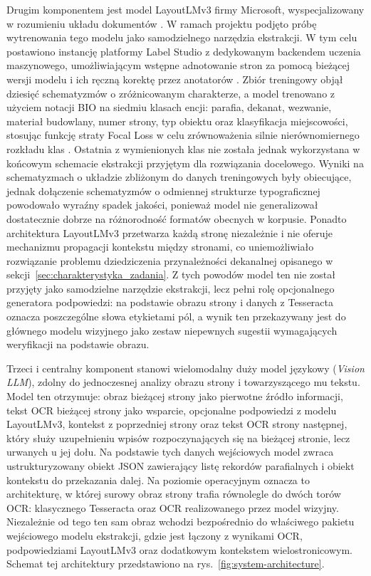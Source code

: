 Drugim komponentem jest model LayoutLMv3 firmy Microsoft, wyspecjalizowany w rozumieniu układu dokumentów \parencite{huang2022layoutlmv3}.
W ramach projektu podjęto próbę wytrenowania tego modelu jako samodzielnego narzędzia ekstrakcji.
W tym celu postawiono instancję platformy Label Studio z dedykowanym backendem uczenia maszynowego, umożliwiającym wstępne adnotowanie stron za pomocą bieżącej wersji modelu i ich ręczną korektę przez anotatorów \parencite{labelstudio_ml_backend_2026}.
Zbiór treningowy objął dziesięć schematyzmów o zróżnicowanym charakterze, a model trenowano z użyciem notacji BIO na siedmiu klasach encji: parafia, dekanat, wezwanie, materiał budowlany, numer strony, typ obiektu oraz klasyfikacja miejscowości, stosując funkcję straty Focal Loss w celu zrównoważenia silnie nierównomiernego rozkładu klas \parencite{lin2017focal}.
Ostatnia z wymienionych klas nie została jednak wykorzystana w końcowym schemacie ekstrakcji przyjętym dla rozwiązania docelowego.
Wyniki na schematyzmach o układzie zbliżonym do danych treningowych były obiecujące, jednak dołączenie schematyzmów o odmiennej strukturze typograficznej powodowało wyraźny spadek jakości, ponieważ model nie generalizował dostatecznie dobrze na różnorodność formatów obecnych w korpusie.
Ponadto architektura LayoutLMv3 przetwarza każdą stronę niezależnie i nie oferuje mechanizmu propagacji kontekstu między stronami, co uniemożliwiało rozwiązanie problemu dziedziczenia przynależności dekanalnej opisanego w sekcji~\ref{sec:charakterystyka_zadania}.
Z tych powodów model ten nie został przyjęty jako samodzielne narzędzie ekstrakcji, lecz pełni rolę opcjonalnego generatora podpowiedzi: na podstawie obrazu strony i danych z Tesseracta oznacza poszczególne słowa etykietami pól, a wynik ten przekazywany jest do głównego modelu wizyjnego jako zestaw niepewnych sugestii wymagających weryfikacji na podstawie obrazu.

Trzeci i centralny komponent stanowi wielomodalny duży model językowy (\textit{Vision LLM}), zdolny do jednoczesnej analizy obrazu strony i towarzyszącego mu tekstu.
Model ten otrzymuje: obraz bieżącej strony jako pierwotne źródło informacji, tekst OCR bieżącej strony jako wsparcie, opcjonalne podpowiedzi z modelu LayoutLMv3, kontekst z poprzedniej strony oraz tekst OCR strony następnej, który służy uzupełnieniu wpisów rozpoczynających się na bieżącej stronie, lecz urwanych u jej dołu.
Na podstawie tych danych wejściowych model zwraca ustrukturyzowany obiekt JSON zawierający listę rekordów parafialnych i obiekt kontekstu do przekazania dalej.
Na poziomie operacyjnym oznacza to architekturę, w której surowy obraz strony trafia równolegle do dwóch torów OCR: klasycznego Tesseracta oraz OCR realizowanego przez model wizyjny.
Niezależnie od tego ten sam obraz wchodzi bezpośrednio do właściwego pakietu wejściowego modelu ekstrakcji, gdzie jest łączony z wynikami OCR, podpowiedziami LayoutLMv3 oraz dodatkowym kontekstem wielostronicowym.
Schemat tej architektury przedstawiono na rys.~\ref{fig:system-architecture}.

